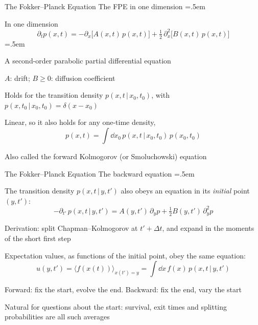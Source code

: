 \documentclass[xcolor={dvipsnames},t]{beamer}
\let\olditemize=\itemize
\let\endolditemize=\enditemize
\renewenvironment{itemize}{\olditemize \itemsep=.5em }{\endolditemize}
\newcommand{\gv}{\,|\,}
\begin{document}
\begin{frame}{The Fokker--Planck Equation}
    \alert{The FPE in one dimension}
    \begin{itemize}
        \item<2-> In one dimension
        \[ \boxed{\;\partial_t p(x,t) = -\partial_x\bigl[A(x,t)\,p(x,t)\bigr] + \tfrac12\,\partial_x^2\bigl[B(x,t)\,p(x,t)\bigr]\;} \]
        \vspace{-1.5em}
        \begin{itemize}
            \item<3-> A second-order parabolic partial differential equation
        \end{itemize}
        \item<4-> $A$: drift; $B\ge0$: diffusion coefficient
        \item<5-> Holds for the transition density $p(x,t\gv x_0,t_0)$, with $p(x,t_0\gv x_0,t_0)=\delta(x-x_0)$
        \item<6-> Linear, so it also holds for any one-time density,
        \[ p(x,t)=\int\dd x_0\,p(x,t\gv x_0,t_0)\,p(x_0,t_0) \]
        \item<7-> Also called the forward Kolmogorov (or Smoluchowski) equation
    \end{itemize}
\end{frame}

\begin{frame}{The Fokker--Planck Equation}
    \alert{The backward equation}
    \begin{itemize}
        \item<2-> The transition density $p(x,t\gv y,t')$ also obeys an equation in its \textit{initial} point $(y,t')$:
        \[ -\partial_{t'}\,p(x,t\gv y,t') = A(y,t')\,\partial_yp + \tfrac12B(y,t')\,\partial_y^2p \]
        \item<3-> Derivation: split Chapman--Kolmogorov at $t'+\Delta t$, and expand in the moments of the short first step
        \item<4-> Expectation values, as functions of the initial point, obey the same equation:
        \[ u(y,t') = \bigl\langle f(x(t))\bigr\rangle_{x(t')=y} = \int\dd x\,f(x)\,p(x,t\gv y,t') \]
        \vspace{-1.5em}
        \item<5-> Forward: fix the start, evolve the end. Backward: fix the end, vary the start
        \item<6-> Natural for questions about the start: survival, exit times and splitting probabilities are all such averages
    \end{itemize}
\end{frame}
\end{document}
